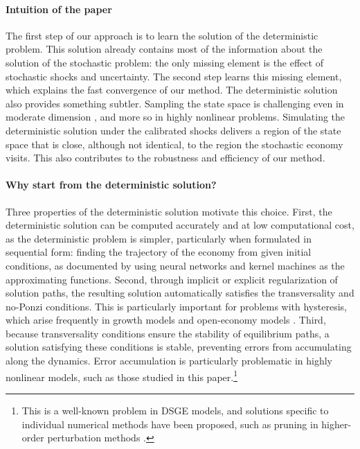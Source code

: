 \documentclass[11pt]{article}
\begin{document}
\paragraph{Intuition of the paper} The first step of our approach is to
learn the solution of the deterministic problem. This solution already contains
most of the information about the solution of the stochastic problem: the only
missing element is the effect of stochastic shocks and uncertainty. The second step learns this missing
element, which explains the fast convergence of our method. 
The deterministic solution also provides something subtler.
Sampling the state space is challenging even in moderate
dimension \citep{kahou2021exploiting, fernandez2026taming}, and more so in highly nonlinear problems. Simulating the
deterministic solution under the calibrated shocks delivers a region of the state space that is close, although not identical, to
the region the stochastic economy visits.
This also contributes to the robustness and efficiency of our method.



\paragraph{Why start from the deterministic solution?} Three properties of the deterministic solution motivate this choice. First, the deterministic solution can be computed accurately and at low computational cost, as the deterministic problem is simpler, particularly when formulated in sequential form: finding the trajectory of the economy from given initial conditions, as documented by \citet{kahou2024spooky, kahou2026kernel} using neural networks and kernel machines as the approximating functions.  Second, through implicit or explicit regularization of solution paths, the resulting solution automatically satisfies the transversality and no-Ponzi conditions. This is particularly important for problems with hysteresis, which arise frequently in growth models \citep{skiba1978optimal, azariadis1990threshold} and open-economy models \citep{mendoza2010sudden, mendoza2020fipit}. Third, because transversality conditions ensure the stability of equilibrium paths, a solution satisfying these conditions is stable, preventing errors from accumulating along the dynamics. Error accumulation is particularly problematic in highly nonlinear models, such as those studied in this paper.\footnote{This is a well-known problem in DSGE models, and solutions specific to individual numerical methods have been proposed, such as pruning in higher-order perturbation methods \citep{kim2008calculating, andreasen2018pruned}.}
\end{document}

